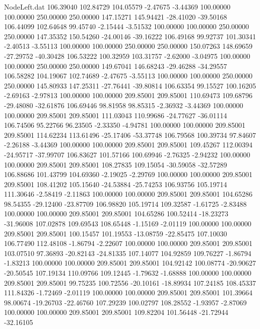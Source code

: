 \begin{filecontents}{NodeLeft.dat}
 106.39040  102.84729  104.05579    -2.47675   -3.44369  100.00000  100.00000  250.00000  250.00000  147.15271  145.94421  -28.41020  -39.50168
 106.44099  102.64648   99.45740    -2.15444   -3.51532  100.00000  100.00000  250.00000  250.00000  147.35352  150.54260  -24.00146  -39.16222
 106.49168   99.92737  101.30341    -2.40513   -3.55113  100.00000  100.00000  250.00000  250.00000  150.07263  148.69659  -27.29752  -40.30428
 106.53222  100.32959  103.31757    -2.62000   -3.04975  100.00000  100.00000  250.00000  250.00000  149.67041  146.68243  -29.46288  -34.29557
 106.58282  104.19067  102.74689    -2.47675   -3.55113  100.00000  100.00000  250.00000  250.00000  145.80933  147.25311  -27.76441  -39.80814
 106.63354   99.15527  100.16205    -2.69163   -2.97813  100.00000  100.00000  209.85001  209.85001  110.69473  109.68796  -29.48080  -32.61876
 106.69446   98.81958   98.85315    -2.36932   -3.44369  100.00000  100.00000  209.85001  209.85001  111.03043  110.99686  -24.77627  -36.01114
 106.74506   95.22766   96.23505    -2.33350   -4.94781  100.00000  100.00000  209.85001  209.85001  114.62234  113.61496  -25.17406  -53.37748
 106.79568  100.39734   97.84607    -2.26188   -3.44369  100.00000  100.00000  209.85001  209.85001  109.45267  112.00394  -24.95717  -37.99707
 106.83627  101.57166  100.69946    -2.76325   -2.94232  100.00000  100.00000  209.85001  209.85001  108.27835  109.15054  -30.59058  -32.57289
 106.88686  101.43799  104.69360    -2.19025   -2.29769  100.00000  100.00000  209.85001  209.85001  108.41202  105.15640  -24.53884  -25.74253
 106.93756  105.19714  111.30646    -2.58419   -2.11863  100.00000  100.00000  209.85001  209.85001  104.65286   98.54355  -29.12400  -23.87709
 106.98820  105.19714  109.32587    -1.61725   -2.83488  100.00000  100.00000  209.85001  209.85001  104.65286  100.52414  -18.23273  -31.96008
 107.02878  109.69543  108.65448    -1.15169   -2.01119  100.00000  100.00000  209.85001  209.85001  100.15457  101.19553  -13.08759  -22.85475
 107.10030  106.77490  112.48108    -1.86794   -2.22607  100.00000  100.00000  209.85001  209.85001  103.07510   97.36893  -20.82143  -24.81335
 107.14077  104.92859  109.76227    -1.86794   -1.83213  100.00000  100.00000  209.85001  209.85001  104.92142  100.08774  -20.90627  -20.50545
 107.19134  110.09766  109.12445    -1.79632   -1.68888  100.00000  100.00000  209.85001  209.85001   99.75235  100.72556  -20.10161  -18.89934
 107.24185  108.45337  111.84326    -1.72469   -2.01119  100.00000  100.00000  209.85001  209.85001  101.39664   98.00674  -19.26703  -22.46760
 107.29239  100.02797  108.28552    -1.93957   -2.87069  100.00000  100.00000  209.85001  209.85001  109.82204  101.56448  -21.72944  -32.16105

\end{filecontents}
